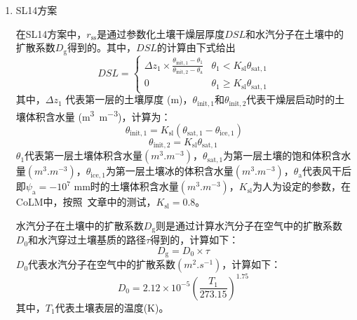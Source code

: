 \begin{enumerate}
    \def\labelenumi{\arabic{enumi}.}
  \item
    SL14方案

    在SL14方案中，\(r_{\mathrm{ss}}\)是通过参数化土壤干燥层厚度\(DSL\)和水汽分子在土壤中的扩散系数\(D_{\mathrm{g}}\)得到的。其中，\(DSL\)的计算由下式给出
    \begin{equation}
      DSL = \begin{cases}
        \Delta z_{1} \times \frac{\theta_{\mathrm{init,1}} - \theta_{1}}{\theta_{\mathrm{init,2}} - \theta_{\mathrm{a}}} & \theta_{1} < K_{\mathrm{sl}}\theta_{\mathrm{sat,1}} \\
        0   & \theta_{1} \geqslant K_{\mathrm{sl}}\theta_{\mathrm{sat,1}}
      \end{cases}
    \end{equation}
    其中，$\Delta z_{1}$ 代表第一层的土壤厚度 (\unit{m})，\(\theta_{\mathrm{init,1}}\)和\(\theta_{\mathrm{init,2}}\)代表干燥层启动时的土壤体积含水量 (\unit{m^{3}.m^{-3}})，计算为：
    \begin{equation}
      \theta_{\mathrm{init,1}} = K_{\mathrm{sl}}\left(\theta_{\mathrm{sat,1}} - \theta_{\mathrm{ice,1}} \right)
    \end{equation}
    \begin{equation}
      \theta_{\mathrm{init,2}} = K_{\mathrm{sl}}\theta_{\mathrm{sat,1}}\
    \end{equation}
    \(\theta_{1}\)代表第一层土壤体积含水量\((\unit{m^{3}.m^{-3}})\)，\(\theta_{\mathrm{sat,1}}\)为第一层土壤的饱和体积含水量\((\unit{m^{3}.m^{-3}})\)，\(\theta_{\mathrm{ice,1}}\)为第一层土壤冰的体积含水量\((\unit{m^{3}.m^{-3}})\)，\(\theta_{\mathrm{a}}\)代表风干后即\(\psi_{\mathrm{a}} = - 10^{7}\) mm时的土壤体积含水量\((\unit{m^{3}.m^{-3}})\)，\(K_{\mathrm{sl}}\)为人为设定的参数，在CoLM中，按照~\citet{sl2014}文章中的测试，$K_{\mathrm{sl}}=0.8$。

    水汽分子在土壤中的扩散系数\(D_{\mathrm{g}}\)则是通过计算水汽分子在空气中的扩散系数\(D_{0}\)和水汽穿过土壤基质的路径\(\tau\)得到的，计算如下：
    \begin{equation}
      D_{\mathrm{g}} = D_{0} \times \tau\
    \end{equation}
    \(D_{0}\)代表水汽分子在空气中的扩散系数\((\unit{m^{2}.s^{- 1}})\)，计算如下：
    \begin{equation}
      D_{0} = 2.12 \times 10^{- 5}\left( \frac{T_{1}}{273.15} \right)^{1.75}\
    \end{equation}
    其中，\(T_{1}\)代表土壤表层的温度(K)。


\end{enumerate}
